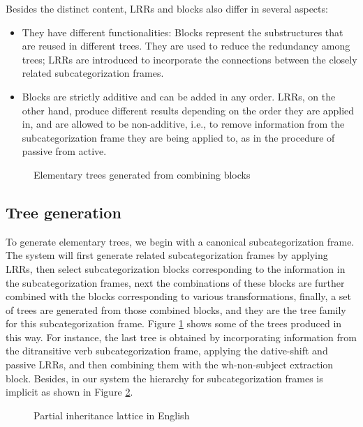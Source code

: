 Besides the distinct content, LRRs and blocks also differ in several 
aspects:
\begin{itemize}
  \item They have different functionalities: Blocks represent
    the substructures that are reused in different trees. They
    are used to reduce the redundancy among trees; LRRs are introduced
    to incorporate the connections between the closely
     related subcategorization
    frames. 
  \item Blocks are strictly additive and can be added in any order.
       LRRs, on the other hand,
    produce different results depending on the order they are applied in,
    and
    are allowed to be non-additive, i.e., to remove information from 
    the subcategorization frame they are being applied to, as in
    the procedure of passive from active.
\end{itemize}
    


\begin{figure}[htb]
\centerline{}
\caption{Elementary trees generated from combining blocks}
\label{elem}
\end{figure}



\subsection{Tree generation}
To generate elementary trees,
 we begin with a canonical subcategorization frame. 
The system will first generate 
related subcategorization frames 
by applying LRRs, then select
subcategorization blocks corresponding to the information in
the subcategorization frames, next 
the combinations of these blocks
are further combined with the blocks corresponding to
 various transformations, finally,  a set of trees are generated
from those combined blocks, and they are 
the tree family for this subcategorization frame. 
Figure \ref{elem} shows some
of the trees produced in this way.  For instance, the last tree is obtained by
incorporating information from the ditransitive verb subcategorization frame,
applying the dative-shift and passive LRRs, and then combining them with the
wh-non-subject extraction block. 
Besides, in our system the hierarchy for subcategorization frames is implicit
as shown in Figure \ref{lattice}.

\begin{figure}[htb]
\centerline{}
\caption{Partial inheritance lattice in English}
\label{lattice}
\end{figure}




